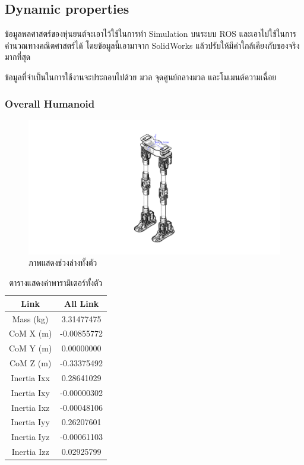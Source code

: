 \newcommand{\addprop}[9]{
	CoM X (m) & #1\\
	CoM Y (m) & #2\\
	CoM Z (m) & #3\\
	Inertia Ixx & #4\\
	Inertia Ixy & #5\\
	Inertia Ixz & #6\\
	Inertia Iyy & #7\\
	Inertia Iyz & #8\\
	Inertia Izz & #9\\
}

\subsection{Dynamic properties}
ข้อมูลพลศาสตร์ของหุ่นยนต์จะเอาไว้ใช้ในการทำ Simulation บนระบบ ROS และเอาไปใช้ในการคำนวณทางคณิตศาสตร์ได้
โดยข้อมูลนี้เอามาจาก SolidWorks แล้วปรับให้มีค่าใกล้เคียงกับของจริงมากที่สุด

ข้อมูลที่จำเป็นในการใช้งานจะประกอบไปด้วย มวล จุดศูนย์กลางมวล และโมเมนต์ความเฉื่อย

\subsubsection*{Overall Humanoid}
\begin{figure}[h!]
	\centering
	\includegraphics[width=\textwidth]{chapter3/images/uthai_dynamic_all.jpeg}
	\caption{ภาพแสดงช่วงล่างทั้งตัว}
	\label{fig:uthai_dynamic_all}
\end{figure}
\begin{table}[h!]
	\centering
	\begin{tabular}{| c | c |}
		\hline
		Link & All Link\\
		\hline
		Mass (kg) & 3.31477475 \\
		\addprop{-0.00855772}{0.00000000}{-0.33375492}{0.28641029}{-0.00000302}{-0.00048106}{0.26207601}{-0.00061103}{0.02925799}
		\hline
	\end{tabular}
	\caption{ตารางแสดงค่าพารามิเตอร์ทั้งตัว}
	\label{tab:uthai_dynamic_all}
\end{table}


